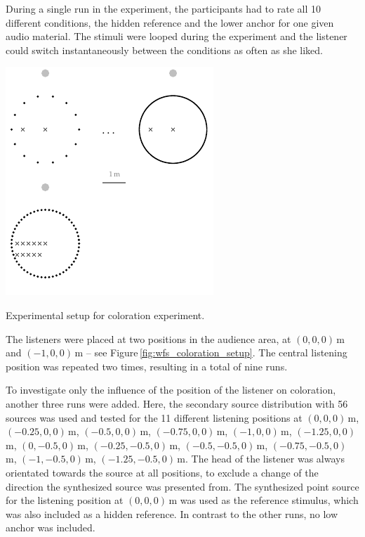 During a single run in the experiment, the participants had to rate all
10 different conditions, the hidden
reference and the lower anchor for one given audio material.
The stimuli were looped during the experiment and the listener could
switch instantaneously between the conditions as often as she liked.
%
\begin{marginfigure}
    \centering
    \includegraphics{fig5_07/fig5_07}
    \caption{Experimental setup for coloration experiment.
    }
    \label{fig:wfs_coloration_setup}
\end{marginfigure}
%
The listeners were placed at two positions in the audience area, at
$(0,0,0)$\,m and $(-1,0,0)$\,m -- see Figure\,\ref{fig:wfs_coloration_setup}.
The central listening position was repeated two times, resulting in a total of
nine runs.

To investigate only the influence of the position of the listener
on coloration, another three runs were added. Here, the secondary source distribution
with 56 sources was used and
tested for the 11 different listening positions at $(0,0,0)$\,m, $(-0.25,0,0)$\,m,
$(-0.5,0,0)$\,m, $(-0.75,0,0)$\,m, $(-1,0,0)$\,m, $(-1.25,0,0)$\,m,
$(0,-0.5,0)$\,m, \linebreak
$(-0.25,-0.5,0)$\,m, $(-0.5,-0.5,0)$\,m,
$(-0.75,-0.5,0)$\,m, $(-1,-0.5,0)$\,m, $(-1.25,-0.5,0)$\,m. The head of the
listener was always orientated towards the source at all positions, to exclude a
change of the direction the synthesized source was presented from.
The synthesized point source for the listening
position at $(0,0,0)$\,m was used as the reference stimulus, which was also
included as a hidden reference. In contrast to the other runs,
no low anchor was included.

